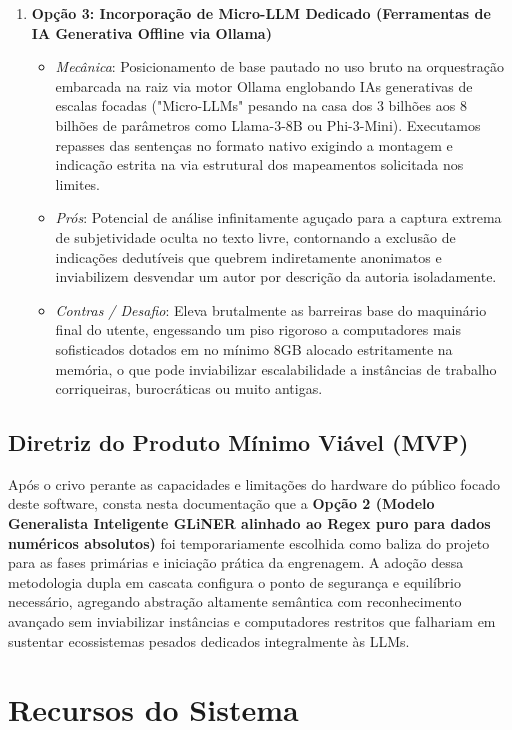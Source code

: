 \documentclass{scrreprt}
\begin{document}
\begin{enumerate}
    \item \textbf{Opção 3: Incorporação de Micro-LLM Dedicado (Ferramentas de IA Generativa Offline via Ollama)}
    \begin{itemize}
        \item \textit{Mecânica}: Posicionamento de base pautado no uso bruto na orquestração embarcada na raiz via motor Ollama englobando IAs generativas de escalas focadas ("Micro-LLMs" pesando na casa dos 3 bilhões aos 8 bilhões de parâmetros como Llama-3-8B ou Phi-3-Mini). Executamos repasses das sentenças no formato nativo exigindo a montagem e indicação estrita na via estrutural dos mapeamentos solicitada nos limites.
        \item \textit{Prós}: Potencial de análise infinitamente aguçado para a captura extrema de subjetividade oculta no texto livre, contornando a exclusão de indicações dedutíveis que quebrem indiretamente anonimatos e inviabilizem desvendar um autor por descrição da autoria isoladamente. 
        \item \textit{Contras / Desafio}: Eleva brutalmente as barreiras base do maquinário final do utente, engessando um piso rigoroso a computadores mais sofisticados dotados em no mínimo 8GB alocado estritamente na memória, o que pode inviabilizar escalabilidade a instâncias de trabalho corriqueiras, burocráticas ou muito antigas.
    \end{itemize}
\end{enumerate}

\section*{Diretriz do Produto Mínimo Viável (MVP)}
Após o crivo perante as capacidades e limitações do hardware do público focado deste software, consta nesta documentação que a \textbf{Opção 2 (Modelo Generalista Inteligente GLiNER alinhado ao Regex puro para dados numéricos absolutos)} foi temporariamente escolhida como baliza do projeto para as fases primárias e iniciação prática da engrenagem. A adoção dessa metodologia dupla em cascata configura o ponto de segurança e equilíbrio necessário, agregando abstração altamente semântica com reconhecimento avançado sem inviabilizar instâncias e computadores restritos que falhariam em sustentar ecossistemas pesados dedicados integralmente às LLMs.


\chapter{Recursos do Sistema}
\end{document}
